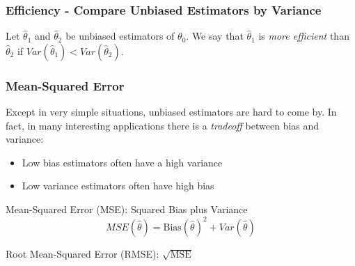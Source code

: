 \begin{frame}
\frametitle{Efficiency - Compare Unbiased Estimators by Variance}
Let $\widehat{\theta}_1$ and $\widehat{\theta}_2$ be unbiased estimators of $\theta_0$. We say that $\widehat{\theta}_1$ is \alert{\emph{more efficient}} than $\widehat{\theta}_2$ if $Var(\widehat{\theta}_1)<Var(\widehat{\theta}_2)$.
\end{frame}

\begin{frame}
\frametitle{Mean-Squared Error}
Except in very simple situations, unbiased estimators are hard to come by. In fact, in many interesting applications there is a \alert{\emph{tradeoff}} between \alert{bias} and \alert{variance}:
\begin{itemize}
\item Low bias estimators often have a high variance 
\item Low variance estimators often have high bias
\end{itemize}
\pause
\vspace{1em}
\alert{Mean-Squared Error (MSE):}   Squared Bias plus Variance
$$ MSE(\widehat{\theta}) = \mbox{Bias}(\widehat{\theta})^2 + Var(\widehat{\theta})$$ 

\alert{Root Mean-Squared Error (RMSE):} $\sqrt{\mbox{MSE}}$  

\end{frame}
